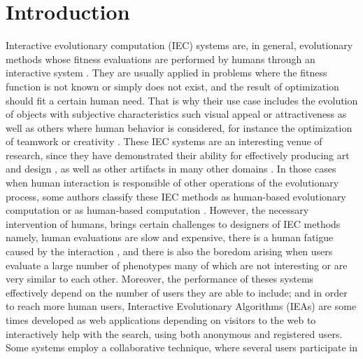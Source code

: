 \section{Introduction}




Interactive evolutionary computation (IEC) systems are, in general, evolutionary methods
whose fitness evaluations are performed by humans through an interactive 
system \cite{eiben2015interactive}.
They are usually applied in problems where the fitness function is not known or simply
does not exist, and the result of optimization should fit a certain human need. 
That is why their use case includes the evolution of objects with subjective characteristics
such visual appeal or attractiveness \cite{biomorphs} as well as others where human behavior is 
considered, for instance the optimization of teamwork \cite{kosorukoff2002evolutionary}
or creativity \cite{yu2011cooks}.
These IEC systems are an interesting venue of research, since they have demonstrated 
their ability for effectively 
producing art and design \cite{Bentley:1999:intro,Sims:1991,todd:1992,evoeco},
as well as other artifacts in many other domains \cite{ie1}. In those cases when 
human interaction is responsible of other 
operations of the evolutionary process, some authors classify these IEC methods 
as human-based evolutionary computation \cite{kosorukoff2001human} 
or as human-based computation \cite{quinn2011human}.
However, the necessary intervention of humans, brings certain challenges 
to designers of IEC methods namely, human evaluations are slow and expensive, there is a
human fatigue caused by the interaction \cite{ie1}, and
there is also the boredom arising when users evaluate a large number of phenotypes 
many of which are not interesting or are very similar to each other.
Moreover, the performance of theses systems effectively depend on the number of users
they are able to include; and in order to reach more human users,
Interactive Evolutionary Algorithms (IEAs) are 
some times developed as web applications depending on visitors to the web to interactively help
with the search, using both anonymous and registered users. Some systems 
employ a collaborative technique, where several users participate in 
